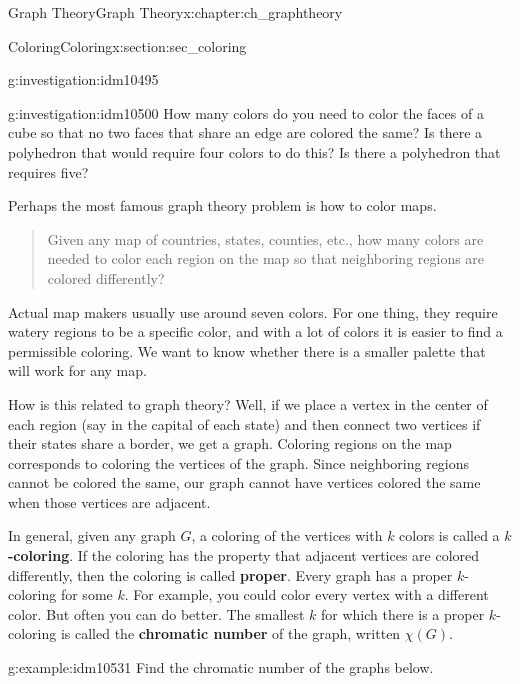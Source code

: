 \documentclass[oneside,10pt,]{book}
\newcommand{\terminology}[1]{\textbf{#1}}
\numberwithin{equation}{chapter}
\begin{document}
\begin{chapterptx}{Graph Theory}{}{Graph Theory}{}{}{x:chapter:ch_graphtheory}
\begin{sectionptx}{Coloring}{}{Coloring}{}{}{x:section:sec_coloring}
\begin{introduction}{}
\begin{investigation}{}{g:investigation:idm10495}
\begin{sidebyside}{1}{0.25}{0.25}{0}
\begin{sbspanel}{0.5}
{
}%
\end{sbspanel}%
\end{sidebyside}%
\end{investigation}
\begin{investigation}{}{g:investigation:idm10500}%
How many colors do you need to color the faces of a cube so that no two faces that share an edge are colored the same?  Is there a polyhedron that would require four colors to do this?  Is there a polyhedron that requires five?%
\end{investigation}
Perhaps the most famous graph theory problem is how to color maps.%
\begin{quote}%
Given any map of countries, states, counties, etc., how many colors are needed to color each region on the map so that neighboring regions are colored differently?%
\end{quote}
Actual map makers usually use around seven colors. For one thing, they require watery regions to be a specific color, and with a lot of colors it is easier to find a permissible coloring. We want to know whether there is a smaller palette that will work for any map.%
\par
How is this related to graph theory? Well, if we place a vertex in the center of each region (say in the capital of each state) and then connect two vertices if their states share a border, we get a graph. Coloring regions on the map corresponds to coloring the vertices of the graph. Since neighboring regions cannot be colored the same, our graph cannot have vertices colored the same when those vertices are adjacent.%
\par
In general, given any graph \(G\), a coloring of the vertices with \(k\) colors is called a \terminology{\(k\)-coloring}. If the coloring has the property that adjacent vertices are colored differently, then the coloring is called \terminology{proper}. Every graph has a proper \(k\)-coloring for some \(k\). For example, you could color every vertex with a different color. But often you can do better. The smallest \(k\) for which there is a proper \(k\)-coloring is called the \terminology{chromatic number} of the graph, written \(\chi(G)\)\label{g:notation:idm10527}.%
\begin{example}{}{g:example:idm10531}%
Find the chromatic number of the graphs below.%

\end{example}
\end{introduction}
\end{sectionptx}
\end{chapterptx}
\end{document}
